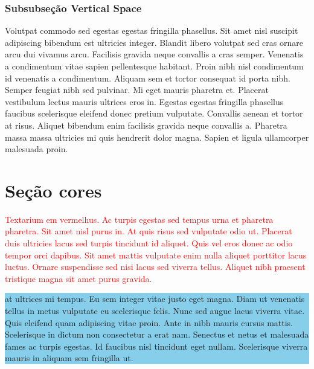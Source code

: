 \documentclass[12pt]{article}
\begin{document}
	\subsubsection{Subsubseção Vertical Space}
		\vspace{1.5cm} %
		Volutpat commodo sed egestas egestas fringilla phasellus. Sit amet nisl suscipit adipiscing bibendum est ultricies integer. Blandit libero volutpat sed cras ornare arcu dui vivamus arcu. Facilisis gravida neque convallis a cras semper. Venenatis a condimentum vitae sapien pellentesque habitant. Proin nibh nisl condimentum id venenatis a condimentum. Aliquam sem et tortor consequat id porta nibh. Semper feugiat nibh sed pulvinar. Mi eget mauris pharetra et. \vspace{1cm}Placerat vestibulum lectus mauris ultrices eros in. Egestas egestas fringilla phasellus faucibus scelerisque eleifend donec pretium vulputate. Convallis aenean et tortor at risus. Aliquet bibendum enim facilisis gravida neque convallis a. Pharetra massa massa ultricies mi quis hendrerit dolor magna. Sapien et ligula ullamcorper malesuada proin.
	\newpage	
	
	\section{Seção cores}
	\pagecolor{yellow} %
	\textcolor{red}{Textarium em vermelhus. Ac turpis egestas sed tempus urna et pharetra pharetra. Sit amet nisl purus in. At quis risus sed vulputate odio ut. Placerat duis ultricies lacus sed turpis tincidunt id aliquet. Quis vel eros donec ac odio tempor orci dapibus. Sit amet mattis vulputate enim nulla aliquet porttitor lacus luctus. Ornare suspendisse sed nisi lacus sed viverra tellus. Aliquet nibh praesent tristique magna sit amet purus gravida.} 
	
	\begin{flushleft}
		\colorbox{SkyBlue}{ %
			\parbox{\textwidth}{%
				at ultrices mi tempus. Eu sem integer vitae justo eget magna. Diam ut venenatis tellus in metus vulputate eu scelerisque felis. Nunc sed augue lacus viverra vitae. Quis eleifend quam adipiscing vitae proin. Ante in nibh mauris cursus mattis. Scelerisque in dictum non consectetur a erat nam. Senectus et netus et malesuada fames ac turpis egestas. Id faucibus nisl tincidunt eget nullam. Scelerisque viverra mauris in aliquam sem fringilla ut.} }
	\end{flushleft}
	
\end{document}
